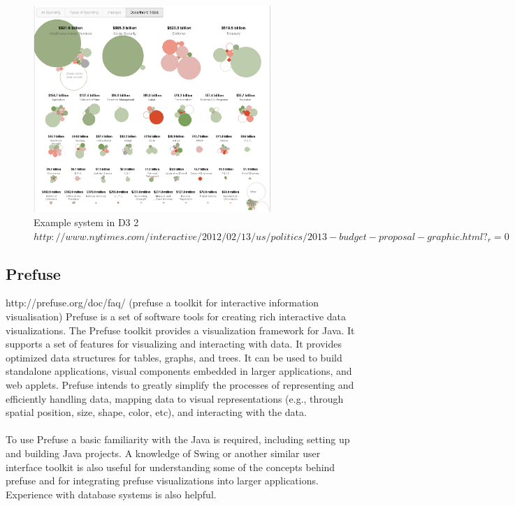 \documentclass[11pt
              , a4paper
              , twoside
              , openright
              ]{report}
\begin{document}
\begin{figure}[h!]
  \centering
      \includegraphics[width=0.8\textwidth]{images/d32.jpg}
  \caption{Example system in D3 2 $http://www.nytimes.com/interactive/2012/02/13/us/politics/2013-budget-proposal-graphic.html?_r=0$}
\end{figure}

\subsection{Prefuse}
http://prefuse.org/doc/faq/
(prefuse a toolkit for interactive information visualisation)
Prefuse is a set of software tools for creating rich interactive data visualizations. The Prefuse toolkit provides a visualization framework for Java.  It supports a set of features for visualizing and interacting with data. It provides optimized data structures for tables, graphs, and trees. It can be used to build standalone applications, visual components embedded in larger applications, and web applets. Prefuse intends to greatly simplify the processes of representing and efficiently handling data, mapping data to visual representations (e.g., through spatial position, size, shape, color, etc), and interacting with the data. 
\\\\
To use Prefuse a basic familiarity with the Java is required, including setting up and building Java projects. A knowledge of Swing or another similar user interface toolkit is also useful for understanding some of the concepts behind prefuse and for integrating prefuse visualizations into larger applications. Experience with database systems is also helpful.
\end{document}
